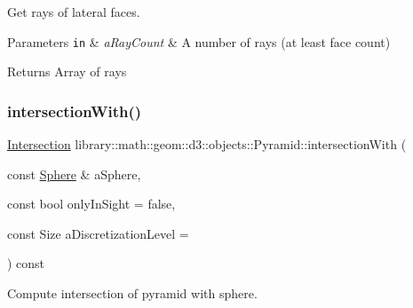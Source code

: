 Get rays of lateral faces. 


\begin{DoxyParams}[1]{Parameters}
\mbox{\tt in}  & {\em a\+Ray\+Count} & A number of rays (at least face count) \\
\hline
\end{DoxyParams}
\begin{DoxyReturn}{Returns}
Array of rays 
\end{DoxyReturn}
\mbox{\label{classlibrary_1_1math_1_1geom_1_1d3_1_1objects_1_1_pyramid_a4f3d9b5270a86b462c33c0b1ddeee873}} 
\subsubsection{\texorpdfstring{intersection\+With()}{intersectionWith()}\hspace{0.1cm}{\footnotesize\ttfamily [1/2]}}
{\footnotesize\ttfamily \hyperlink{classlibrary_1_1math_1_1geom_1_1d3_1_1_intersection}{Intersection} library\+::math\+::geom\+::d3\+::objects\+::\+Pyramid\+::intersection\+With (\begin{DoxyParamCaption}\item[{const \hyperlink{classlibrary_1_1math_1_1geom_1_1d3_1_1objects_1_1_sphere}{Sphere} \&}]{a\+Sphere,  }\item[{const bool}]{only\+In\+Sight = {\ttfamily false},  }\item[{const Size}]{a\+Discretization\+Level = {} }\end{DoxyParamCaption}) const}



Compute intersection of pyramid with sphere. 


